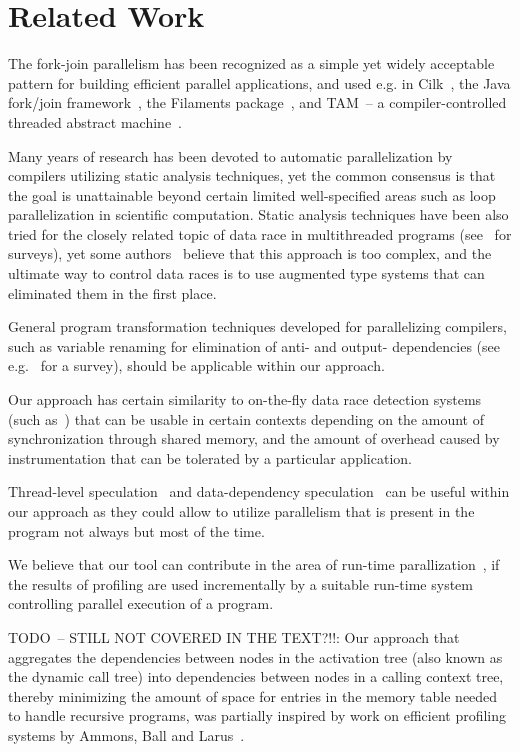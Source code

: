 %

\section{Related Work}

The fork-join parallelism has been recognized as a simple yet widely
acceptable pattern for building efficient parallel applications, and used e.g. in
Cilk~\cite{BJKLR96}, the Java fork/join framework~\cite{Lea00}, the
Filaments package~\cite{LF00}, and {TAM}~-- a compiler-controlled
threaded abstract machine~\cite{CGSE93,GSC95}. 

Many years of research has been devoted to automatic parallelization
by compilers utilizing static analysis techniques, yet the common
consensus is that the goal is unattainable beyond certain limited
well-specified areas such as loop parallelization in scientific
computation. Static analysis techniques have been also tried for the
closely related topic of data race in multithreaded programs
(see~\cite{Rinard01,NAW06} for surveys), yet some
authors~\cite{Rinard01} believe that this approach is too complex, and
the ultimate way to control data races is to use augmented type systems
that can eliminated them in the first place.

General program transformation techniques developed for parallelizing
compilers, such as variable renaming for elimination of anti- and
output- dependencies (see e.g.~\cite{Bacon:1994:CompilerTransformation}
for a survey), should be applicable within our approach.

Our approach has certain similarity to on-the-fly data race detection
systems (such as~\cite{MellorCrummey91,SBNSA97,HRY02}) that can be
usable in certain contexts depending on the amount of synchronization
through shared memory, and the amount of overhead caused by instrumentation that
can be tolerated by a particular application.

Thread-level speculation~\cite{PO03} and data-dependency
speculation~\cite{RS01b} can be useful within our approach as they could
allow to utilize parallelism that is present in the program not always
but most of the time.

We believe that our tool can contribute in the area of run-time
parallization~\cite{Rauchwerger98}, if the results of profiling are used
incrementally by a suitable run-time system controlling parallel
execution of a program.

TODO~-- STILL NOT COVERED IN THE TEXT?!!: Our approach that aggregates
the dependencies between nodes in the activation tree (also known as the
dynamic call tree) into dependencies between nodes in a calling context
tree, thereby minimizing the amount of space for entries in the memory
table needed to handle recursive programs, was partially inspired by
work on efficient profiling systems by Ammons, Ball and
Larus~\cite{ABL97}.

